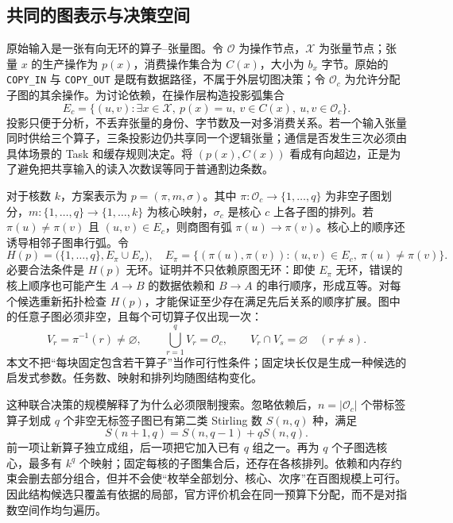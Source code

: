 \subsection{共同的图表示与决策空间}
原始输入是一张有向无环的算子--张量图。令 $\mathcal O$ 为操作节点，$\mathcal X$ 为张量节点；张量 $x$ 的生产操作为 $p(x)$，消费操作集合为 $C(x)$，大小为 $b_x$ 字节。原始的 \texttt{COPY\_IN} 与 \texttt{COPY\_OUT} 是既有数据路径，不属于外层切图决策；令 $\mathcal O_c$ 为允许分配子图的其余操作。为讨论依赖，在操作层构造投影弧集合
\begin{equation}\label{eq:op-projection}
E_c=\{(u,v):\exists x\in\mathcal X,\ p(x)=u,\ v\in C(x),\ u,v\in\mathcal O_c\}.
\end{equation}
投影只便于分析，不丢弃张量的身份、字节数及一对多消费关系。若一个输入张量同时供给三个算子，三条投影边仍共享同一个逻辑张量；通信是否发生三次必须由具体场景的 Task 和缓存规则决定。将 $(p(x),C(x))$ 看成有向超边，正是为了避免把共享输入的读入次数误等同于普通割边条数。

对于核数 $k$，方案表示为 $p=(\pi,m,\sigma)$。其中 $\pi:\mathcal O_c\to\{1,\ldots,q\}$ 为非空子图划分，$m:\{1,\ldots,q\}\to\{1,\ldots,k\}$ 为核心映射，$\sigma_c$ 是核心 $c$ 上各子图的排列。若 $\pi(u)\ne\pi(v)$ 且 $(u,v)\in E_c$，则商图有弧 $\pi(u)\to\pi(v)$。核心上的顺序还诱导相邻子图串行弧。令
\begin{equation}\label{eq:expanded-quotient}
H(p)=\bigl(\{1,\ldots,q\},E_\pi\cup E_\sigma\bigr),\quad
E_\pi=\{(\pi(u),\pi(v)):(u,v)\in E_c,\ \pi(u)\ne\pi(v)\}.
\end{equation}
必要合法条件是 $H(p)$ 无环。证明并不只依赖原图无环：即使 $E_\pi$ 无环，错误的核上顺序也可能产生 $A\to B$ 的数据依赖和 $B\to A$ 的串行顺序，形成互等。对每个候选重新拓扑检查 $H(p)$，才能保证至少存在满足先后关系的顺序扩展。图中的任意子图必须非空，且每个可切算子仅出现一次：
\begin{equation}\label{eq:partition-cover}
V_r=\pi^{-1}(r)\ne\varnothing,\qquad
\bigcup_{r=1}^{q}V_r=\mathcal O_c,\qquad
V_r\cap V_s=\varnothing\quad(r\ne s).
\end{equation}
本文不把“每块固定包含若干算子”当作可行性条件；固定块长仅是生成一种候选的启发式参数。任务数、映射和排列均随图结构变化。

这种联合决策的规模解释了为什么必须限制搜索。忽略依赖后，$n=|\mathcal O_c|$ 个带标签算子划成 $q$ 个非空无标签子图已有第二类 Stirling 数 $S(n,q)$ 种，满足
\begin{equation}\label{eq:stirling}
S(n+1,q)=S(n,q-1)+qS(n,q).
\end{equation}
前一项让新算子独立成组，后一项把它加入已有 $q$ 组之一。再为 $q$ 个子图选核心，最多有 $k^q$ 个映射；固定每核的子图集合后，还存在各核排列。依赖和内存约束会删去部分组合，但并不会使“枚举全部划分、核心、次序”在百图规模上可行。因此结构候选只覆盖有依据的局部，官方评价机会在同一预算下分配，而不是对指数空间作均匀遍历。

